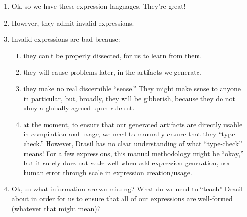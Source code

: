 


\begin{enumerate}

      \item Ok, so we have these expression languages. They're great!

      \item However, they admit invalid expressions.

      \item Invalid expressions are bad because:

            \begin{enumerate}

                  \item they can't be properly dissected, for us to learn from
                        them.

                  \item they will cause problems later, in the artifacts we
                        generate.

                  \item they make no real discernible ``sense.'' They might make
                        sense to anyone in particular, but, broadly, they will
                        be gibberish, because they do not obey a globally agreed
                        upon rule set.

                  \item at the moment, to ensure that our generated artifacts
                        are directly usable in compilation and usage, we need to
                        manually ensure that they ``type-check.'' However,
                        Drasil has no clear understanding of what ``type-check''
                        means! For a few expressions, this manual methodology
                        might be ``okay,'' but it surely does not scale well
                        when add expression generation, nor human error through
                        scale in expression creation/usage.

            \end{enumerate}

      \item Ok, so what information are we missing? What do we need to ``teach''
            Drasil about in order for us to ensure that all of our expressions
            are well-formed (whatever that might mean)?


\end{enumerate}
